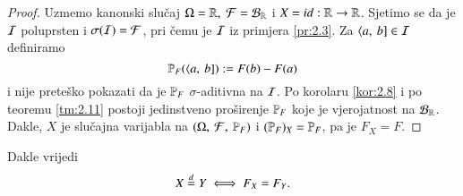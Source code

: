 \begin{proof}
    Uzmemo kanonski slu\v caj $\Omega = \mathbb{R}, \; \mathcal{F} = \mathcal{B}_{\mathbb{R}}$ i $X = id : \mathbb{R} \to \mathbb{R}$.
    Sjetimo se da je $\mathcal{I}$ poluprsten i $\sigma({\mathcal{I}}) = \mathcal{F}$, pri \v cemu je $\mathcal{I}$ iz primjera \ref{pr:2.3}.
    Za $\langle {a}, \: {b}] \in\mathcal{I}$ definiramo
    \begin{equation}    \label{jed:5.7}
        \mathbb{P}_F (\langle {a}, \: {b}]) := F (b) - F(a)
    \end{equation}
    i nije prete\v sko pokazati da je $\mathbb{P}_F$ $\sigma$-aditivna na $\mathcal{I}$.
    Po korolaru \ref{kor:2.8} i po teoremu \ref{tm:2.11} postoji jedinstveno pro\v sirenje $\mathbb{P}_F$ koje je vjerojatnost na $\mathcal{B}_{\mathbb{R}}$.
    Dakle, $X$ je slu\v cajna varijabla na $(\Omega, \: \mathcal{F}, \: \mathbb{P}_F)$ i $(\mathbb{P}_F)_X = \mathbb{P}_F$, pa je $F_X = F$.
\end{proof}

Dakle vrijedi
\begin{equation*}
    X \overset{d}{=} Y \iff F_X = F_Y.
\end{equation*}

